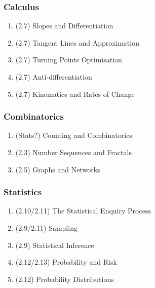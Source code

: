\subsubsection*{Calculus}
\begin{enumerate}[resume]
  \item (2.7) Slopes and Differentiation
  \item (2.7) Tangent Lines and Approximation
  \item (2.7) Turning Points Optimisation
  \item (2.7) Anti-differentiation
  \item (2.7) Kinematics and Rates of Change
\end{enumerate}

\subsubsection*{Combinatorics}
\begin{enumerate}[resume]
  \item (Stats?) Counting and Combinatorics
  \item (2.3) Number Sequences and Fractals
  \item (2.5) Graphs and Networks
\end{enumerate}

\subsubsection*{Statistics}
\begin{enumerate}[resume]
  \item (2.10/2.11) The Statistical Enquiry Process
  \item (2.9/2.11) Sampling
  \item (2.9) Statistical Inference
  \item (2.12/2.13) Probability and Risk
  \item (2.12) Probability Distributions
\end{enumerate}


